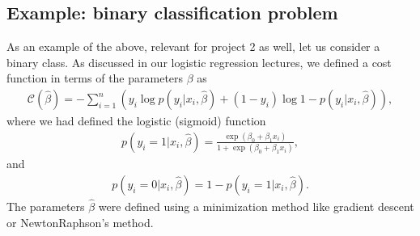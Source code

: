 \documentclass[letterpaper,10pt,english]{sphinxmanual}
\begin{document}
\subsection{Example: binary classification problem}
\label{\detokenize{chapter6:example-binary-classification-problem}}
As an example of the above, relevant for project 2 as well, let us consider a binary class. As discussed in our logistic regression lectures, we defined a cost function in terms of the parameters \(\beta\) as
\begin{equation*}
\begin{split}
\mathcal{C}(\hat{\beta}) = - \sum_{i=1}^n \left(y_i\log{p(y_i \vert x_i,\hat{\beta})}+(1-y_i)\log{1-p(y_i \vert x_i,\hat{\beta})}\right),
\end{split}
\end{equation*}
where we had defined the logistic (sigmoid) function
\begin{equation*}
\begin{split}
p(y_i =1\vert x_i,\hat{\beta})=\frac{\exp{(\beta_0+\beta_1 x_i)}}{1+\exp{(\beta_0+\beta_1 x_i)}},
\end{split}
\end{equation*}
and
\begin{equation*}
\begin{split}
p(y_i =0\vert x_i,\hat{\beta})=1-p(y_i =1\vert x_i,\hat{\beta}).
\end{split}
\end{equation*}
The parameters \(\hat{\beta}\) were defined using a minimization method like gradient descent or Newton\sphinxhyphen{}Raphson’s method.
\end{document}
